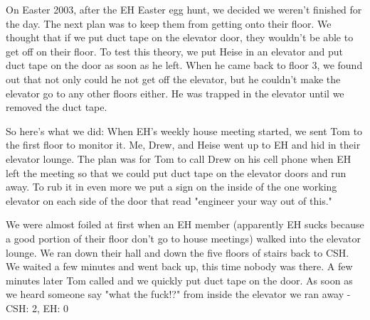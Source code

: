 \documentclass[10pt]{article} %
\begin{document}
\begin{minipage}[t]{.66\linewidth}
\hypertarget{thirdnews}{} %

\small
On Easter 2003, after the EH Easter egg hunt, we decided we weren't finished for the day. The next plan was to keep them from getting onto their floor. We thought that if we put duct tape on the elevator door, they wouldn't be able to get off on their floor.
To test this theory, we put Heise in an elevator and put duct tape on the door as soon as he left. When he came back to floor 3, we found out that not only could he not get off the elevator, but he couldn't make the elevator go to any other floors either. He was trapped in the elevator until we removed the duct tape.

So here's what we did: When EH's weekly house meeting started, we sent Tom to the first floor to monitor it. Me, Drew, and Heise went up to EH and hid in their elevator lounge. The plan was for Tom to call Drew on his cell phone when EH left the meeting so that we could put duct tape on the elevator doors and run away. To rub it in even more we put a sign on the inside of the one working elevator on each side of the door that read "engineer your way out of this."

We were almost foiled at first when an EH member (apparently EH sucks because a good portion of their floor don't go to house meetings) walked into the elevator lounge. We ran down their hall and down the five floors of stairs back to CSH. We waited a few minutes and went back up, this time nobody was there. A few minutes later Tom called and we quickly put duct tape on the door. As soon as we heard someone say "what the fuck!?" from inside the elevator we ran away - CSH: 2, EH: 0

\end{minipage} %
\end{document}
